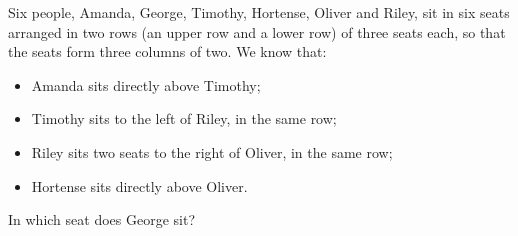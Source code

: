 Six people, Amanda, George, Timothy, Hortense, Oliver and Riley, sit in six seats arranged in two rows (an upper row and a lower row) of three seats each, so that the seats form three columns of two. We know that:
\begin{itemize}
\item Amanda sits directly above Timothy;
\item Timothy sits to the left of Riley, in the same row;
\item Riley sits two seats to the right of Oliver, in the same row;
\item Hortense sits directly above Oliver.
\end{itemize}
In which seat does George sit?
